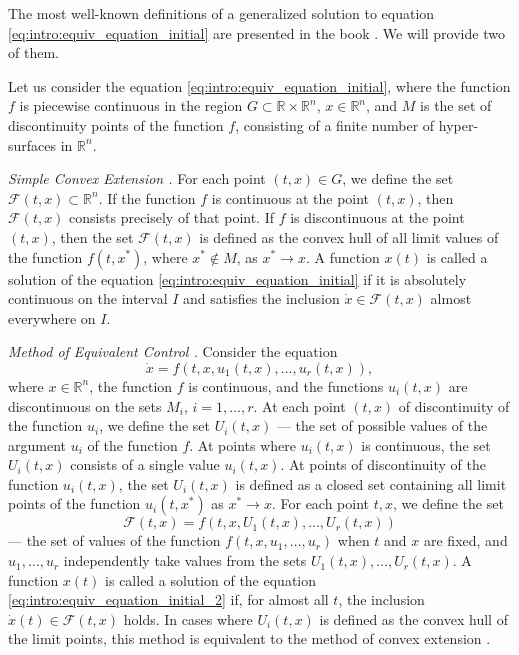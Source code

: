 The most well-known definitions of a generalized solution to equation \eqref{eq:intro:equiv_equation_initial} are presented in the book \cite{Filippov1988}. We will provide two of them.

Let us consider the equation \eqref{eq:intro:equiv_equation_initial}, where the function $f$ is piecewise continuous in the region $G \subset \mathbb{R} \times \mathbb{R}^n$, $x \in \mathbb{R}^n$, and $M$ is the set of discontinuity points of the function $f$, consisting of a finite number of hyper-surfaces in $\mathbb{R}^n$.

\emph{Simple Convex Extension \cite{Filippov1988}.} For each point $(t, x) \in G$, we define the set $\mathcal{F}(t, x) \subset \mathbb{R}^n$. If the function $f$ is continuous at the point $(t, x)$, then $\mathcal{F}(t, x)$ consists precisely of that point. If $f$ is discontinuous at the point $(t, x)$, then the set $\mathcal{F}(t, x)$ is defined as the convex hull of all limit values of the function $f(t, x^*)$, where $x^* \not\in M$, as $x^* \to x$. A function $x(t)$ is called a solution of the equation \eqref{eq:intro:equiv_equation_initial} if it is absolutely continuous on the interval $I$ and satisfies the inclusion $\dot{x} \in \mathcal{F}(t, x)$ almost everywhere on $I$.

\emph{Method of Equivalent Control \cite{Utkin1981}.} Consider the equation 
\begin{equation}
	\label{eq:intro:equiv_equation_initial_2}
	\dot{x} = f(t, x, u_1(t, x), \ldots, u_r(t, x)),
\end{equation}
where $x \in \mathbb{R}^n$, the function $f$ is continuous, and the functions $u_i(t, x)$ are discontinuous on the sets $M_i$, $i = 1, \ldots, r$. At each point $(t, x)$ of discontinuity of the function $u_i$, we define the set $U_i(t, x)$ — the set of possible values of the argument $u_i$ of the function $f$. At points where $u_i(t, x)$ is continuous, the set $U_i(t, x)$ consists of a single value $u_i(t, x)$. At points of discontinuity of the function $u_i(t, x)$, the set $U_i(t, x)$ is defined as a closed set containing all limit points of the function $u_i(t, x^*)$ as $x^* \to x$. For each point $t, x$, we define the set
\[
\mathcal{F}(t, x) = f(t, x, U_1(t, x), \ldots, U_r(t, x))
\]
— the set of values of the function $f(t, x, u_1, \ldots, u_r)$ when $t$ and $x$ are fixed, and $u_1, \ldots, u_r$ independently take values from the sets $U_1(t, x), \ldots, U_r(t, x)$. A function $x(t)$ is called a solution of the equation \eqref{eq:intro:equiv_equation_initial_2} if, for almost all $t$, the inclusion $\dot{x}(t) \in \mathcal{F}(t, x)$ holds. In cases where $U_i(t, x)$ is defined as the convex hull of the limit points, this method is equivalent to the method of convex extension \cite{Filippov1988}.


